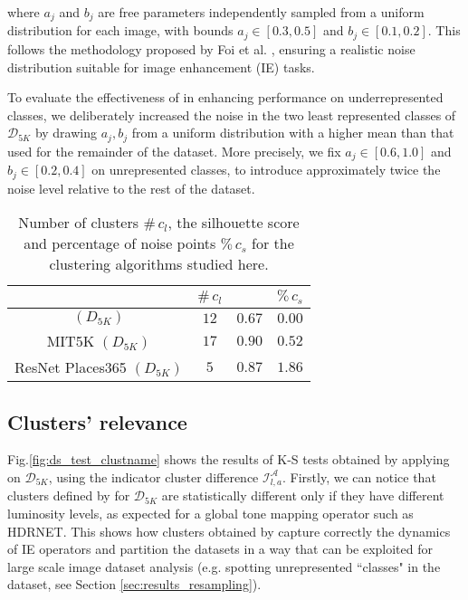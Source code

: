 \documentclass[12pt]{spieman}  %
\begin{document}
\begin{spacing}{2}
\begin{linenumbers}
 {where $a_j$ and $b_j$ are free parameters independently sampled from a uniform distribution for each image, with bounds $a_j \in \left [ 0.3 , 0.5 \right ]$ and $b_j \in \left [ 0.1 , 0.2 \right ]$. This follows the methodology proposed by Foi et al.} \cite{Foi2008}  {, ensuring a realistic noise distribution suitable for image enhancement (IE) tasks.} 





To evaluate the effectiveness of \clustname in enhancing performance on underrepresented classes, we deliberately increased the noise in the two least represented classes of $\mathcal{D}_{5K}$ by drawing $a_j, b_j$ from a uniform distribution with a higher mean than that used for the remainder of the dataset. {More precisely,  we fix $a_j \in \left [ 0.6 , 1.0 \right ]$ and $b_j \in \left [ 0.2 , 0.4 \right ]$ on unrepresented classes, to introduce approximately twice the noise level relative to the rest of the dataset.}





\begin{table}[!t]
	\renewcommand{\arraystretch}{1.3}
	\caption{Number of clusters $\# \, c_l$, the silhouette score \silscore and percentage of noise points $\% \, c_s$ for the clustering algorithms studied here.}
	\centering
	\begin{tabular}{c||c|c|c}
		\hline
		&  $\# \, c_l$ & \silscore  & $\% \, c_s$\\
		\hline\hline
		\clustname $({D}_{5K})$ & $12$ & $0.67$  & $0.00$\\
		\hline
		 MIT5K $({D}_{5K})$ & $17$ & $0.90$  & $0.52$ \\
		\hline
		ResNet Places365 $({D}_{5K})$ & $5$ & $0.87$ &  $1.86$\\
		\hline
	\end{tabular}
	\label{table:clusters}
\end{table}








\subsection{Clusters' relevance}
\label{subsection:clu_rel}
Fig.\ref{fig:ds_test_clustname} shows the results of K-S tests obtained by applying \clustname on $\mathcal{D}_{5K}$, using the indicator cluster difference $\mathcal{I}_{l,a}^{\mathcal{A}}$. Firstly, we can notice that clusters defined by \clustname for  $\mathcal{D}_{5K}$ are statistically different only if they have different luminosity levels, as expected for a global tone mapping operator such as HDRNET. This shows how clusters obtained by \clustname capture correctly the dynamics of IE operators and  partition the datasets in a way that can be exploited for large scale image dataset analysis (e.g. spotting unrepresented ``classes" in the dataset, see Section \ref{sec:results_resampling}).



\end{linenumbers}
\end{spacing}
\end{document}
